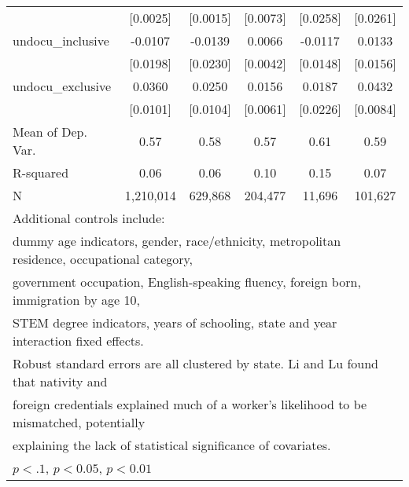 \begin{table}[htbp]
\begin{tabular}{l*{5}{c}}
                    &    [0.0025]         &    [0.0015]         &    [0.0073]         &    [0.0258]         &    [0.0261]         \\
\addlinespace
undocu\_inclusive    &     -0.0107         &     -0.0139         &      0.0066         &     -0.0117         &      0.0133         \\
                    &    [0.0198]         &    [0.0230]         &    [0.0042]         &    [0.0148]         &    [0.0156]         \\
\addlinespace
undocu\_exclusive    &      0.0360\sym{***}&      0.0250\sym{**} &      0.0156\sym{**} &      0.0187         &      0.0432\sym{***}\\
                    &    [0.0101]         &    [0.0104]         &    [0.0061]         &    [0.0226]         &    [0.0084]         \\
\midrule
Mean of Dep. Var.   &        0.57         &        0.58         &        0.57         &        0.61         &        0.59         \\
R-squared           &        0.06         &        0.06         &        0.10         &        0.15         &        0.07         \\
N                   &   1,210,014         &     629,868         &     204,477         &      11,696         &     101,627         \\
\bottomrule
\multicolumn{6}{l}{\footnotesize Additional controls include:}\\
\multicolumn{6}{l}{\footnotesize dummy age indicators, gender, race/ethnicity, metropolitan residence, occupational category,}\\
\multicolumn{6}{l}{\footnotesize government occupation, English-speaking fluency, foreign born, immigration by age 10,}\\
\multicolumn{6}{l}{\footnotesize STEM degree indicators, years of schooling, state and year interaction fixed effects.}\\
\multicolumn{6}{l}{\footnotesize Robust standard errors are all clustered by state. Li and Lu found that nativity and}\\
\multicolumn{6}{l}{\footnotesize foreign credentials explained much of a worker's likelihood to be mismatched, potentially}\\
\multicolumn{6}{l}{\footnotesize explaining the lack of statistical significance of covariates.}\\
\multicolumn{6}{l}{\footnotesize \sym{*} \(p<.1\), \sym{**} \(p<0.05\), \sym{***} \(p<0.01\)}\\
\end{tabular}
\end{table}
